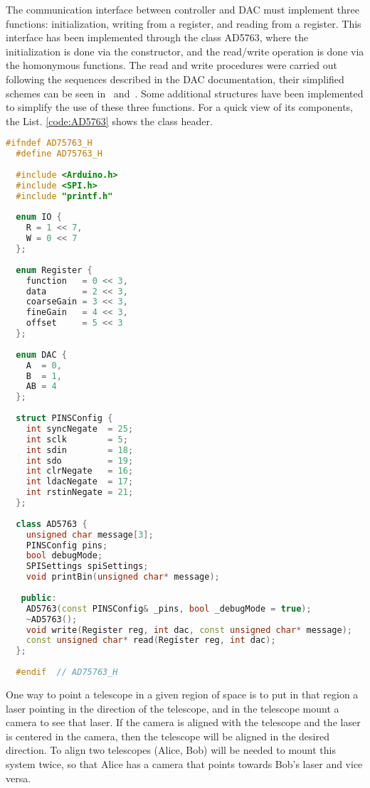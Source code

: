 The communication interface between controller and DAC must implement three functions: initialization, writing from a register, and reading from a register. This interface has been implemented through the class AD5763, where the initialization is done via the constructor, and the read/write operation is done via the homonymous functions. The read and write procedures were carried out following the sequences described in the DAC documentation, their simplified schemes can be seen in~ and~. Some additional structures have been implemented to simplify the use of these three functions.
For a quick view of its components, the List. \ref{code:AD5763} shows the class header.
\begin{lstlisting}[language=c++, gobble=2, label=code:AD5763]
  #ifndef AD75763_H
  #define AD75763_H
  
  #include <Arduino.h>
  #include <SPI.h>
  #include "printf.h"
  
  enum IO {
    R = 1 << 7,
    W = 0 << 7
  };
  
  enum Register {
    function   = 0 << 3,
    data       = 2 << 3,
    coarseGain = 3 << 3,
    fineGain   = 4 << 3,
    offset     = 5 << 3
  };
  
  enum DAC {
    A  = 0,
    B  = 1,
    AB = 4
  };
  
  struct PINSConfig {
    int syncNegate  = 25;
    int sclk        = 5;
    int sdin        = 18;
    int sdo         = 19;
    int clrNegate   = 16;
    int ldacNegate  = 17;
    int rstinNegate = 21;
  };
  
  class AD5763 {
    unsigned char message[3];
    PINSConfig pins;
    bool debugMode;
    SPISettings spiSettings;
    void printBin(unsigned char* message);
  
   public:
    AD5763(const PINSConfig& _pins, bool _debugMode = true);
    ~AD5763();
    void write(Register reg, int dac, const unsigned char* message);
    const unsigned char* read(Register reg, int dac);
  };
  
  #endif  // AD75763_H
\end{lstlisting}


One way to point a telescope in a given region of space is to put in that region a laser pointing in the direction of the telescope, and in the telescope mount a camera to see that laser.
If the camera is aligned with the telescope and the laser is centered in the camera, then the telescope will be aligned in the desired direction.
To align two telescopes (Alice, Bob) will be needed to mount this system twice, so that Alice has a camera that points towards Bob’s laser and vice versa.

